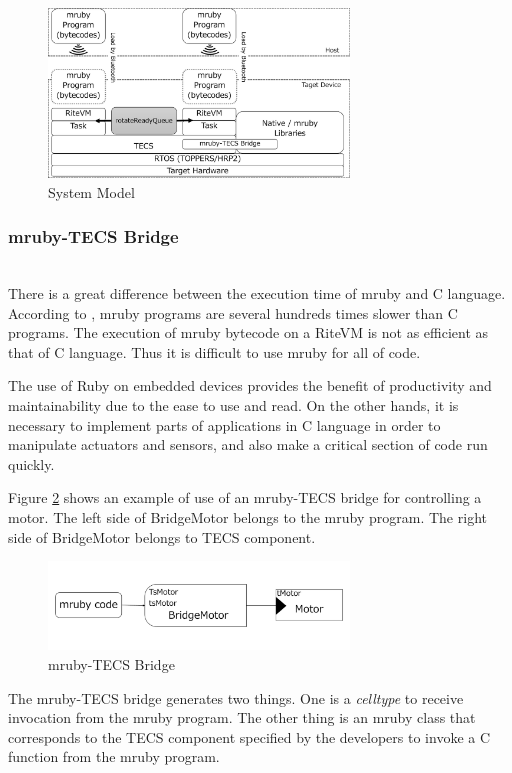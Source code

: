\documentclass[conference,compsoc]{IEEEtran}
\begin{document}
\begin{figure}[t]
    \centering
    \includegraphics[width=8cm,clip]{figure/system_model.pdf}
    \caption{System Model}
    \label{fig:system_model}
\end{figure}

\subsubsection{mruby-TECS Bridge}\mbox{}\\

There is a great difference between the execution time of mruby and C language.
According to  \cite{par:mrubyonTECS}, mruby programs are several hundreds times slower than C programs.
The execution of mruby bytecode on a RiteVM is not as efficient as that of C language.
Thus it is difficult to use mruby for all of code.

The use of Ruby on embedded devices provides the benefit of productivity and maintainability due to the ease to use and read.
On the other hands, it is necessary to implement parts of applications in C language in order to manipulate actuators and sensors, and also make a critical section of code run quickly.

Figure \ref{fig:mruby_TECS_bridge} shows an example of use of an mruby-TECS bridge for controlling a motor.
The left side of BridgeMotor belongs to the mruby program.
The right side of BridgeMotor belongs to TECS component.
\begin{figure}[t]
    \centering
    \includegraphics[width=8cm,clip]{figure/mruby_TECS_bridge.pdf}
    \caption{mruby-TECS Bridge}
    \label{fig:mruby_TECS_bridge}
\end{figure}

The mruby-TECS bridge generates two things.
One is a {\it celltype} to receive invocation from the mruby program.
The other thing is an mruby class that corresponds to the TECS component specified by the developers to invoke a C function from the mruby program.
\end{document}
